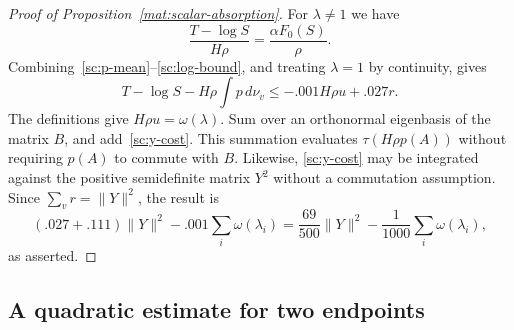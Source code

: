 \documentclass[11pt]{article}
\newcommand{\norm}[1]{\lVert #1\rVert}
\theoremstyle{definition}
\theoremstyle{remark}
\numberwithin{equation}{section}
\begin{document}
\begin{proof}[Proof of Proposition~\ref{mat:scalar-absorption}]
For $\lambda\ne1$ we have
\[
 \frac{T-\log S}{H\rho}=\frac{\alpha F_0(S)}{\rho}.
\]
Combining~\eqref{sc:p-mean}--\eqref{sc:log-bound}, and treating $\lambda=1$
by continuity, gives
\[
 T-\log S-H\rho\int p\,d\nu_v
       \le -.001H\rho u+.027r.
\]
The definitions give $H\rho u=\omega(\lambda)$.  Sum over an orthonormal
eigenbasis of the matrix $B$, and add~\eqref{sc:y-cost}.
This summation evaluates $\tau(H\rho p(A))$ without requiring $p(A)$
to commute with $B$.  Likewise, \eqref{sc:y-cost} may be integrated
against the positive semidefinite matrix $Y^2$ without a commutation
assumption.  Since $\sum_v r=\norm{Y}^2$, the result is
\[
 (.027+.111)\norm{Y}^2-.001\sum_i\omega(\lambda_i)
 =\frac{69}{500}\norm{Y}^2-\frac1{1000}\sum_i\omega(\lambda_i),
\]
as asserted.
\end{proof}

\subsection{A quadratic estimate for two endpoints}\label{sc:pair-proof}
\end{document}
